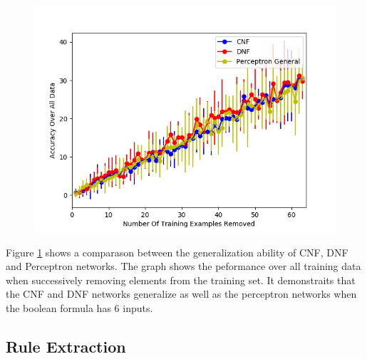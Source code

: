 \begin{figure}[H]
  \centering
  \begin{minipage}[b]{0.8\textwidth}
    \includegraphics[width=\textwidth]{6-generalization.png}
    \caption{}
  \end{minipage}
 \label{fig:generalization-peformance-6}
  \hfill
\end{figure}

Figure \ref{fig:generalization-peformance-6} shows a comparason between the generalization ability of CNF, DNF and Perceptron networks. The graph shows the peformance over all training data when successively removing elements from the training set. It demonstraits that the CNF and DNF networks generalize as well as the perceptron networks when the boolean formula has 6 inputs.

\subsection{Rule Extraction}
